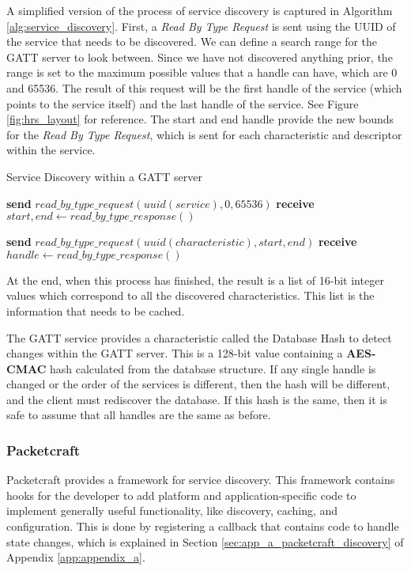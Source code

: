 A simplified version of the process of service discovery is captured in Algorithm \ref{alg:service_discovery}. First, a \textit{Read By Type Request} is sent using the UUID of the service that needs to be discovered. We can define a search range for the GATT server to look between. Since we have not discovered anything prior, the range is set to the maximum possible values that a handle can have, which are 0 and 65536. The result of this request will be the first handle of the service (which points to the service itself) and the last handle of the service. See Figure \ref{fig:hrs_layout} for reference. The start and end handle provide the new bounds for the \textit{Read By Type Request}, which is sent for each characteristic and descriptor within the service.
\begin{algorithm}
    \caption{Service Discovery within a GATT server}
    \label{alg:service_discovery}
    \begin{algorithmic}[1] 
                \State \textbf{send} $\textit{read\_by\_type\_request}(\textit{uuid}(service), 0, 65536)$
                \State \textbf{receive} $start,end \gets \textit{read\_by\_type\_response}()$

                    \State \textbf{send} $\textit{read\_by\_type\_request}(\textit{uuid}(characteristic), start, end)$
                    \State \textbf{receive} $handle \gets \textit{read\_by\_type\_response}()$
                \EndFor
            \EndFor
        \EndProcedure
    \end{algorithmic}
\end{algorithm}

At the end, when this process has finished, the result is a list of 16-bit integer values which correspond to all the discovered characteristics. This list is the information that needs to be cached. 

The GATT service provides a characteristic called the Database Hash to detect changes within the GATT server. This is a 128-bit value containing a \textbf{AES-CMAC} hash calculated from the database structure. If any single handle is changed or the order of the services is different, then the hash will be different, and the client must rediscover the database. If this hash is the same, then it is safe to assume that all handles are the same as before.

\subsubsection{Packetcraft}
Packetcraft provides a framework for service discovery. This framework contains hooks for the developer to add platform and application-specific code to implement generally useful functionality, like discovery, caching, and configuration. This is done by registering a callback that contains code to handle state changes, which is explained in Section \ref{sec:app_a_packetcraft_discovery} of Appendix \ref{app:appendix_a}. 

